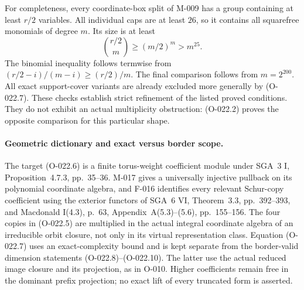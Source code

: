 For completeness, every coordinate-box split of M-009
has a group containing at least $r/2$ variables.
All individual caps are at least $26$, so it contains
all squarefree monomials of degree $m$. Its size is at least
\[
                 \binom{r/2}{m}\geq(m/2)^m>m^{25}.
                                                               \tag{O-022.11}
\]
The binomial inequality follows termwise from
$(r/2-i)/(m-i)\geq(r/2)/m$.
The final comparison follows from $m=2^{200}$.
All exact support-cover variants are already excluded
more generally by (O-022.7).
These checks establish strict refinement of the listed
proved conditions. They do not exhibit an actual
multiplicity obstruction: (O-022.2) proves the opposite
comparison for this particular shape.

\paragraph{Geometric dictionary and exact versus border scope.}
The target (O-022.6) is a finite torus-weight coefficient
module under SGA~3 I, Proposition~4.7.3, pp.~35--36.
M-017 gives a universally injective pullback on its
polynomial coordinate algebra, and F-016 identifies every
relevant Schur-copy coefficient using the exterior functors
of SGA~6 VI, Theorem~3.3, pp.~392--393, and Macdonald
I(4.3), p.~63, Appendix~A(5.3)--(5.6), pp.~155--156.
The four copies in (O-022.5) are multiplied in the actual
integral coordinate algebra of an irreducible orbit closure,
not only in its virtual representation class.
Equation (O-022.7) uses an exact-complexity bound and is
kept separate from the border-valid dimension statements
(O-022.8)--(O-022.10). The latter use the actual reduced
image closure and its projection, as in O-010.
Higher coefficients remain free in the dominant prefix
projection; no exact lift of every truncated form is asserted.
